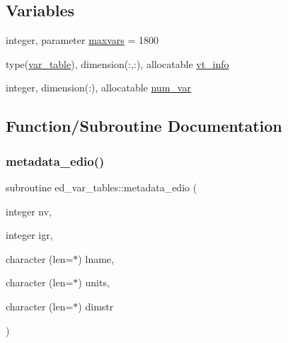 \subsection*{Variables}
\begin{DoxyCompactItemize}
\item 
integer, parameter \hyperlink{namespaceed__var__tables_a932cd6738531dd3348d40636bd8a20ae}{maxvars} = 1800
\item 
type(\hyperlink{structed__var__tables_1_1var__table}{var\+\_\+table}), dimension(\+:,\+:), allocatable \hyperlink{namespaceed__var__tables_a949fa9110a835bd59e16bd0a5e153498}{vt\+\_\+info}
\item 
integer, dimension(\+:), allocatable \hyperlink{namespaceed__var__tables_ae879757190201e461d3bc09131321a64}{num\+\_\+var}
\end{DoxyCompactItemize}


\subsection{Function/\+Subroutine Documentation}
\mbox{\label{namespaceed__var__tables_a163fc43f01ed02a236a290d4b1d9575b}} 
\subsubsection{\texorpdfstring{metadata\+\_\+edio()}{metadata\_edio()}}
{\footnotesize\ttfamily subroutine ed\+\_\+var\+\_\+tables\+::metadata\+\_\+edio (\begin{DoxyParamCaption}\item[{integer}]{nv,  }\item[{integer}]{igr,  }\item[{character (len=$\ast$)}]{lname,  }\item[{character (len=$\ast$)}]{units,  }\item[{character (len=$\ast$)}]{dimstr }\end{DoxyParamCaption})}

\mbox{\label{namespaceed__var__tables_aed76c1293872b5f6cf4c39c0747d2bb4}} 
